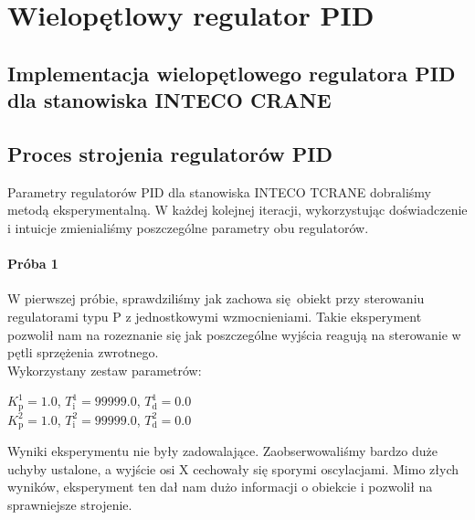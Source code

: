 \chapter{Wielopętlowy regulator PID}
\label{inteco_pid}

\section{Implementacja wielopętlowego regulatora PID dla stanowiska INTECO CRANE}
\label{inteco_impl}
\newpage
\section{Proces strojenia regulatorów PID}
\label{inteco_strojenie_pid}
Parametry regulatorów PID dla stanowiska INTECO TCRANE dobraliśmy metodą eksperymentalną.
W każdej kolejnej iteracji, wykorzystując doświadczenie i intuicje zmienialiśmy poszczególne
parametry obu regulatorów.\\


\subsubsection{Próba 1}
W pierwszej próbie, sprawdziliśmy jak zachowa się obiekt przy sterowaniu regulatorami
typu P z jednostkowymi wzmocnieniami. Takie eksperyment pozwolił nam na rozeznanie się
jak poszczególne wyjścia reagują na sterowanie w pętli sprzężenia zwrotnego.\\

Wykorzystany zestaw parametrów:

\begin{center}
    $K^{\num{1}}_{\mathrm{p}} = \num{1.0}$, $T^{\num{1}}_{\mathrm{i}} = \num{99999.0}$, $T^{\num{1}}_{\mathrm{d}} = \num{0.0}$ \\
    $K^{\num{2}}_{\mathrm{p}} = \num{1.0}$, $T^{\num{2}}_{\mathrm{i}} = \num{99999.0}$, $T^{\num{2}}_{\mathrm{d}} = \num{0.0}$ \\
\end{center}
\vspace{1cm}

Wyniki eksperymentu nie były zadowalające. Zaobserwowaliśmy bardzo duże uchyby ustalone, a 
wyjście osi X cechowały się sporymi oscylacjami. Mimo złych wyników, eksperyment ten dał nam dużo 
informacji o obiekcie i pozwolił na sprawniejsze strojenie.

